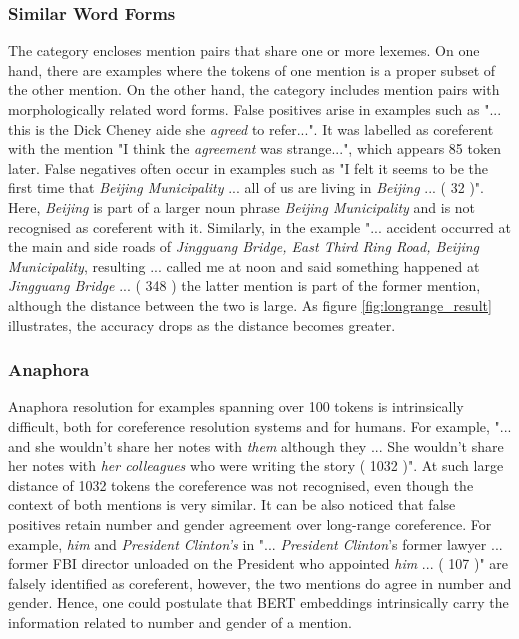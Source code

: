 \documentclass[11pt]{article}
\begin{document}
\subsubsection{Similar Word Forms} 
The category encloses mention pairs that share one or more lexemes. On one hand, there are examples where the tokens of one mention is a proper subset of the other mention. On the other hand, the category includes mention pairs with morphologically related word forms.
False positives arise in examples such as "... this is the Dick Cheney aide she \textit{agreed} to refer...". It was labelled as coreferent with the mention "I think the \textit{agreement} was strange...", which appears 85 token later. 
False negatives often occur in examples such as "I felt it seems to be the first time that \textit{Beijing Municipality} ... all of us are living in \textit{Beijing} ... ( 32 )". Here, \textit{Beijing} is part of a larger noun phrase \textit{Beijing Municipality} and is not recognised as coreferent with it. Similarly, in the example "... accident occurred at the main and side roads of \textit{Jingguang Bridge, East Third Ring Road, Beijing Municipality}, resulting ... called me at noon and said something happened at \textit{Jingguang Bridge} ... ( 348 ) the latter mention is part of the former mention, although the distance between the two is large. As figure \ref{fig:longrange_result} illustrates, the accuracy drops as the distance becomes greater.

\subsubsection{Anaphora}

Anaphora resolution for examples spanning over 100 tokens is intrinsically difficult, both for coreference resolution systems and for humans. For example, "... and she wouldn't share her notes with \textit{them} although they ... She wouldn't share her notes with \textit{her colleagues} who were writing the story ( 1032 )". At such large distance of 1032 tokens the coreference was not recognised, even though the context of both mentions is very similar. It can be also noticed that false positives retain number and gender agreement over long-range coreference. For example, \textit{him} and \textit{President Clinton's} in "... \textit{President Clinton}'s former lawyer ... former FBI director unloaded on the President who appointed \textit{him} ... ( 107 )" are falsely identified as coreferent, however, the two mentions do agree in number and gender. Hence, one could postulate that BERT embeddings intrinsically carry the information related to number and gender of a mention. 
\end{document}
